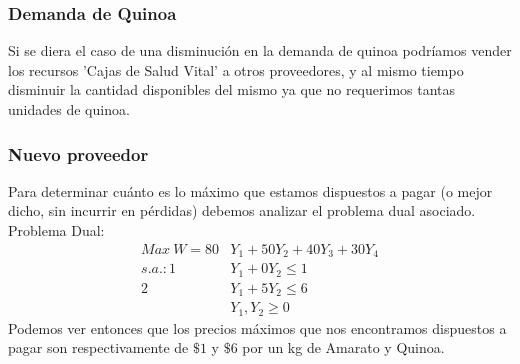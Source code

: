 \begin{homeworkProblem}
\subsubsection{Demanda de Quinoa}
Si se diera el caso de una disminución en la demanda de quinoa podríamos vender los recursos 'Cajas de Salud Vital' a otros proveedores, y al mismo tiempo disminuir la cantidad disponibles del mismo ya que no requerimos tantas unidades de quinoa.
\subsubsection{Nuevo proveedor}
Para determinar cuánto es lo máximo que estamos dispuestos a pagar (o mejor dicho, sin incurrir en pérdidas) debemos analizar el problema dual asociado.
Problema Dual:
\begin{align*}
    Max\ W = 80&Y_1 + 50Y_2 + 40Y_3 + 30Y_4 \\
    s.a.: 1&Y_1 + 0Y_2 \le 1 \\
    2&Y_1 + 5Y_2 \le 6 \\
    &Y_1,Y_2 \ge 0
\end{align*}
Podemos ver entonces que los precios máximos que nos encontramos dispuestos a pagar son respectivamente de $\$1$ y $\$6$ por un kg de Amarato y Quinoa.
\end{homeworkProblem}